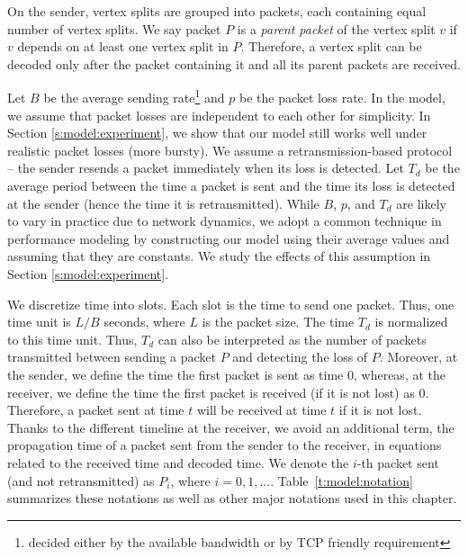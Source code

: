     On the sender, vertex splits are grouped into packets,
    each containing equal number of vertex splits.  We say packet $P$ is a \textit{parent packet}
    of the vertex split $v$ if %
    $v$ 
    depends on at least one vertex split in $P$.  Therefore, a vertex split
    can be decoded only after the packet containing it and all its
    parent packets are received.


    Let $B$ be the average
    sending rate\footnote{decided either by the available bandwidth or by TCP friendly requirement} and $p$ be the packet loss rate.
    In the model, we assume that packet losses are independent to each other for simplicity.
    In Section \ref{s:model:experiment}, we %
    show that our model still works well under realistic packet losses (more bursty).
    We assume a retransmission-based protocol -- the sender resends a packet 
    immediately when its loss is detected.
    Let $T_d$ be the
    average period between the time a packet %
    is sent and the
    time %
    its loss is detected at the sender (hence the time it is retransmitted).
    While $B$, $p$, and $T_d$ are likely to vary in practice due to network dynamics, 
    we adopt a common technique in performance modeling by constructing our model using 
    their average values and assuming that they are constants.
    We study the effects of this assumption in Section \ref{s:model:experiment}.

    We discretize time into slots.  Each slot is the time to
    send one packet.  Thus, one time unit is $L/B$ seconds, where $L$ is the
    packet size.  
    The time $T_d$ is normalized to this
    time unit.  Thus, $T_d$ can also be interpreted as the number
    of packets transmitted between sending a packet $P$ and detecting
    the loss of $P$.  Moreover, at the sender,
    we define the time the first packet is sent as time $0$, whereas, at
    the receiver, we define the time the first packet is received (if it
    is not lost) as $0$.  Therefore, a packet sent at time $t$ will be 
    received at time $t$ if it is not lost.  Thanks to the different 
    timeline at the
    receiver, we avoid an additional term, the propagation time of a packet
    sent from the sender to the receiver, in
    equations related to the received time and decoded time. 
    We denote the $i$-th packet sent (and not retransmitted) as $P_i$, where $i = 0, 1, ...$.
    Table~\ref{t:model:notation} summarizes these notations as well as
    other major notations used in this chapter.

